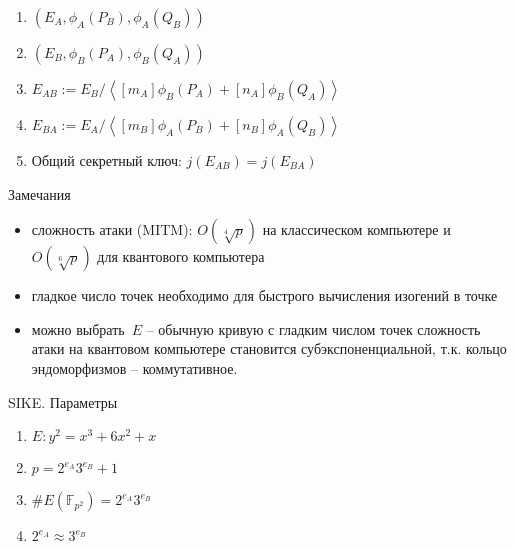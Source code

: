 \documentclass{beamer}
\begin{document}
\begin{frame}
	\begin{enumerate}
		\item
		\structure{{\Large\faUserSecret}} \structure{$\implies$} \structure{{\Large\faCat}:} $(E_A, \phi_A(P_B), \phi_A(Q_B))$
		\item
		\structure{{\Large\faCat}} \structure{$\implies$} \structure{{\Large\faUserSecret}:} $(E_B, \phi_B(P_A), \phi_B(Q_A))$
		\item \structure{{\Large\faUserSecret}:} $E_{AB} := E_B/\left< [m_A]\phi_B(P_A) + [n_A]\phi_B(Q_A) \right>$
		\item \structure{{\Large\faCat}:} $E_{BA} := E_A/\left< [m_B]\phi_A(P_B) + [n_B]\phi_A(Q_B) \right>$
		\item Общий секретный ключ: $j(E_{AB}) = j(E_{BA})$
	\end{enumerate}
\end{frame}

\begin{frame}{Замечания}
	\begin{itemize}
		\item сложность атаки (MITM): $O(\sqrt[4]{p})$ на классическом компьютере и $O(\sqrt[6]{p})$ для квантового компьютера
		\item гладкое число точек необходимо для быстрого вычисления изогений в точке
		\item можно выбрать~$E$ -- обычную кривую с гладким числом точек \structure{$\implies$} сложность атаки на квантовом компьютере становится субэкспоненциальной, т.к. кольцо эндоморфизмов -- коммутативное.
	\end{itemize}
\end{frame}

\begin{frame}{SIKE. Параметры}
\begin{enumerate}
	\item $E: y^2 = x^3 + 6 x^2 + x$
	\item $p = 2^{e_A} 3^{e_B} + 1$
	\item $\#E(\mathbb{F}_{p^2}) = 2^{e_A} 3^{e_B}$
	\item $2^{e_A} \approx 3^{e_B}$
\end{enumerate}
\end{frame}
\end{document}
